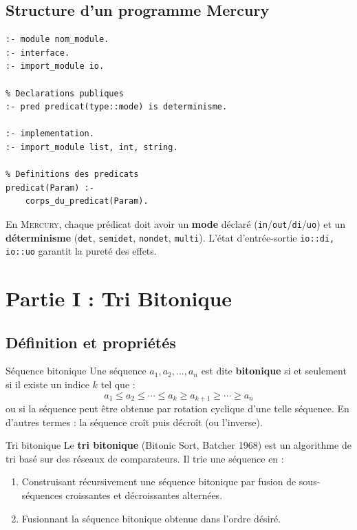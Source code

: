 \documentclass[12pt,a4paper]{article}
\newcommand{\mercury}{\textsc{Mercury}}
\newcommand{\code}[1]{\texttt{\color{keywordcolor}#1}}
\begin{document}
\subsection{Structure d'un programme Mercury}

\begin{lstlisting}[caption={Structure de base d'un module Mercury}]
:- module nom_module.
:- interface.
:- import_module io.

% Declarations publiques
:- pred predicat(type::mode) is determinisme.

:- implementation.
:- import_module list, int, string.

% Definitions des predicats
predicat(Param) :-
    corps_du_predicat(Param).
\end{lstlisting}

\begin{warningbox}
En \mercury{}, chaque prédicat doit avoir un \textbf{mode} déclaré
(\code{in}/\code{out}/\code{di}/\code{uo}) et un \textbf{déterminisme}
(\code{det}, \code{semidet}, \code{nondet}, \code{multi}).
L'état d'entrée-sortie \code{io::di, io::uo} garantit la pureté des effets.
\end{warningbox}

\section{Partie I : Tri Bitonique}

\subsection{Définition et propriétés}

\begin{definitionbox}{Séquence bitonique}
Une séquence $a_1, a_2, \ldots, a_n$ est dite \textbf{bitonique} si et seulement
si il existe un indice $k$ tel que :
$$a_1 \leq a_2 \leq \cdots \leq a_k \geq a_{k+1} \geq \cdots \geq a_n$$
ou si la séquence peut être obtenue par rotation cyclique d'une telle séquence.
En d'autres termes : la séquence croît puis décroît (ou l'inverse).
\end{definitionbox}

\begin{definitionbox}{Tri bitonique}
Le \textbf{tri bitonique} (Bitonic Sort, Batcher 1968) est un algorithme de tri
basé sur des réseaux de comparateurs. Il trie une séquence en :
\begin{enumerate}
  \item Construisant récursivement une séquence bitonique par fusion de
        sous-séquences croissantes et décroissantes alternées.
  \item Fusionnant la séquence bitonique obtenue dans l'ordre désiré.
\end{enumerate}
\end{definitionbox}
\end{document}
